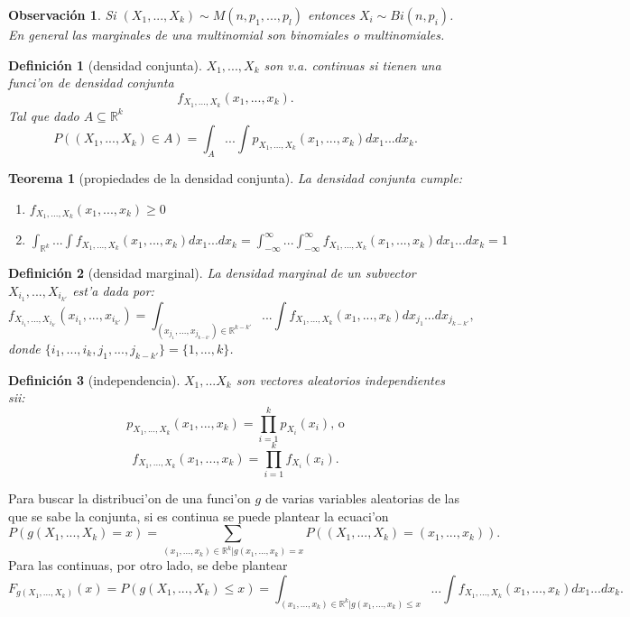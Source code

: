 \documentclass[a4paper,spanish]{article}
\newcommand{\R}[0]{\mathbb{R}}
\newtheorem{teo}{Teorema}
\newtheorem{defi}{Definici\'on}
\newtheorem{obs}{Observaci\'on}
\begin{document}
\begin{obs}
Si $(X_1,...,X_k) \sim M(n,p_1,...,p_l)$ entonces $X_i \sim Bi(n,p_i)$. En
general las marginales de una multinomial son binomiales o multinomiales.
\end{obs}

\begin{defi}[densidad conjunta]
$X_1,...,X_k$ son v.a. continuas si tienen una \emph{funci'on de
densidad conjunta} 
$$f_{X_1,...,X_k}(x_1,...,x_k).$$
Tal que dado $A \subseteq \R^k$ 
$$P((X_1,...,X_k) \in A) = 
	\int_A...\int p_{X_1,...,X_k}(x_1,...,x_k) dx_1...dx_k.$$
\end{defi}

\begin{teo}[propiedades de la densidad conjunta]
La densidad conjunta cumple:
\begin{enumerate}
\item $f_{X_1,...,X_k}(x_1,...,x_k) \geq 0$
\item $\int_{\R^k}...\int f_{X_1,...,X_k}(x_1,...,x_k) dx_1...dx_k = 
	\int_{-\infty}^\infty...\int_{-\infty}^\infty f_{X_1,...,X_k}(x_1,...,x_k) 
		dx_1...dx_k = 1$
\end{enumerate}
\end{teo}

\begin{defi}[densidad marginal]
La \emph{densidad marginal} de un subvector $X_{i_1},...,X_{i_{k'}}$ est'a dada
por:
$$f_{X_{i_1},...,X_{i_{k'}}}(x_{i_1},...,x_{i_{k'}}) = 
	\int_{(x_{j_1},...,x_{j_{k-k'}}) \in \R^{k-k'}}...\int
		f_{X_1,...,X_k}(x_1,...,x_k) dx_{j_1}...dx_{j_{k-k'}},$$
donde $\{i_1,...,i_k,j_1,...,j_{k-k'}\} = \{1,...,k\}$.
\end{defi}

\begin{defi}[independencia]
$X_1,...X_k$ son vectores aleatorios independientes sii:
$$p_{X_1,...,X_k}(x_1,...,x_k) = \prod_{i=1}^k p_{X_i}(x_i)\mbox{, o}$$
$$f_{X_1,...,X_k}(x_1,...,x_k) = \prod_{i=1}^k f_{X_i}(x_i).$$
\end{defi}

Para buscar la distribuci'on de una funci'on $g$ de varias variables aleatorias
de las que se sabe la conjunta, si es continua se puede plantear la ecuaci'on
$$P(g(X_1,...,X_k) = x) = 
	\sum_{(x_1,...,x_k) \in \R^k | g(x_1,...,x_k) = x}
		P((X_1,...,X_k) = (x_1,...,x_k)).$$
Para las continuas, por otro lado, se debe plantear
$$F_{g(X_1,...,X_k)}(x) = P(g(X_1,...,X_k) \leq x) = 
	\int_{(x_1,...,x_k) \in \R^k | g(x_1,...,x_k) \leq x} ... \int
		f_{X_1,...,X_k}(x_1,...,x_k) dx_1...dx_k.$$
\end{document}
